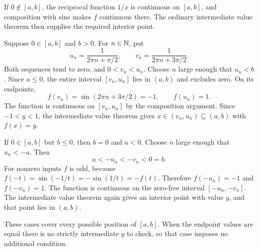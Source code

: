 If $0\notin[a,b]$, the reciprocal function $1/x$ is
continuous on $[a,b]$, and composition with sine makes $f$
continuous there. The ordinary intermediate value theorem
then supplies the required interior point.

Suppose $0\in[a,b]$ and $b>0$.
For $n\in\mathbb{N}$, put
\[
 u_n=\frac1{2\pi n+\pi/2},\qquad
 v_n=\frac1{2\pi n+3\pi/2}.
\]
Both sequences tend to zero, and $0<v_n<u_n$.
Choose $n$ large enough that $u_n<b$.
Since $a\le0$, the entire interval $[v_n,u_n]$ lies in
$(a,b)$ and excludes zero. On its endpoints,
\[
 f(v_n)=\sin(2\pi n+3\pi/2)=-1,
 \qquad f(u_n)=1.
\]
The function is continuous on $[v_n,u_n]$ by the composition
argument. Since $-1<y<1$, the intermediate value theorem
gives $x\in(v_n,u_n)\subseteq(a,b)$ with $f(x)=y$.

If $0\in[a,b]$ but $b\le0$, then $b=0$ and $a<0$.
Choose $n$ large enough that $u_n<-a$.
Then
\[
 a<-u_n<-v_n<0=b.
\]
For nonzero inputs $f$ is odd, because
$f(-t)=\sin(-1/t)=-\sin(1/t)=-f(t)$.
Therefore $f(-u_n)=-1$ and $f(-v_n)=1$.
The function is continuous on the zero-free interval
$[-u_n,-v_n]$. The intermediate value theorem again gives
an interior point with value $y$, and that point lies in
$(a,b)$.

These cases cover every possible position of $[a,b]$.
When the endpoint values are equal there is no strictly
intermediate $y$ to check, so that case imposes no additional
condition.
